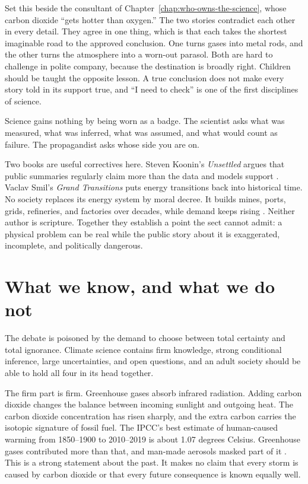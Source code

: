 \documentclass[12pt,a4paper]{book}
\begin{document}
Set this beside the consultant of Chapter~\ref{chap:who-owns-the-science}, whose carbon dioxide ``gets hotter than oxygen.'' The two stories contradict each other in every detail. They agree in one thing, which is that each takes the shortest imaginable road to the approved conclusion. One turns gases into metal rods, and the other turns the atmosphere into a worn-out parasol. Both are hard to challenge in polite company, because the destination is broadly right. Children should be taught the opposite lesson. A true conclusion does not make every story told in its support true, and ``I need to check'' is one of the first disciplines of science.

Science gains nothing by being worn as a badge. The scientist asks what was measured, what was inferred, what was assumed, and what would count as failure. The propagandist asks whose side you are on.

Two books are useful correctives here. Steven Koonin's \emph{Unsettled} argues that public summaries regularly claim more than the data and models support \cite{Koonin2021}. Vaclav Smil's \emph{Grand Transitions} puts energy transitions back into historical time. No society replaces its energy system by moral decree. It builds mines, ports, grids, refineries, and factories over decades, while demand keeps rising \cite{Smil2021}. Neither author is scripture. Together they establish a point the sect cannot admit: a physical problem can be real while the public story about it is exaggerated, incomplete, and politically dangerous.

\section{What we know, and what we do not}

The debate is poisoned by the demand to choose between total certainty and total ignorance. Climate science contains firm knowledge, strong conditional inference, large uncertainties, and open questions, and an adult society should be able to hold all four in its head together.

The firm part is firm. Greenhouse gases absorb infrared radiation. Adding carbon dioxide changes the balance between incoming sunlight and outgoing heat. The carbon dioxide concentration has risen sharply, and the extra carbon carries the isotopic signature of fossil fuel. The IPCC's best estimate of human-caused warming from 1850--1900 to 2010--2019 is about 1.07 degrees Celsius. Greenhouse gases contributed more than that, and man-made aerosols masked part of it \cite{IPCC2021HumanInfluence,IPCC2023Synthesis}. This is a strong statement about the past. It makes no claim that every storm is caused by carbon dioxide or that every future consequence is known equally well.
\end{document}

